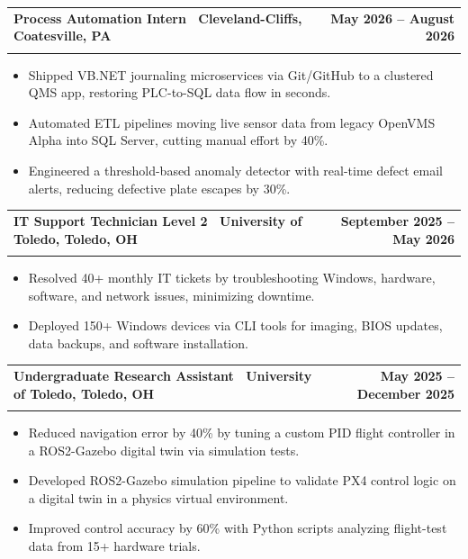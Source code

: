 \documentclass[letterpaper,11pt]{article}
\makeatletter
\newcommand{\resumeItem}[1]{\item\small{#1 \vspace{-4pt}}}
\newcommand{\resumeSubheading}[4]{
    \vspace{-2pt}\item
    \begin{tabular*}{1.0\textwidth}[t]{l@{\extracolsep{\fill}}r}
        \textbf{#1} & \textbf{\small #2} \\
        \textit{\small#3} & \textit{\small #4}
    \end{tabular*}\vspace{-7pt}
}
\newcommand{\resumeItemListStart}{\begin{itemize}}
\newcommand{\resumeItemListEnd}{\end{itemize}\vspace{-7pt}}
\makeatother
\begin{document}
\resumeSubheading
{\textbf{Process Automation Intern} \textnormal{\textbar\ Cleveland-Cliffs, Coatesville, PA}}{May 2026 -- August 2026}
{}{}
\vspace{-0.6cm}
\resumeItemListStart

\resumeItem{Shipped VB.NET journaling microservices via Git/GitHub to a clustered QMS app, restoring PLC-to-SQL data flow in seconds.}

\vspace{0.15cm}

\resumeItem{Automated ETL pipelines moving live sensor data from legacy OpenVMS Alpha into SQL Server, cutting manual effort by 40\%.}
\vspace{0.15cm}


\resumeItem{Engineered a threshold-based anomaly detector with real-time defect email alerts, reducing defective plate escapes by 30\%.}





\vspace{0.15cm}
\resumeItemListEnd
\resumeSubheading
{\textbf{IT Support Technician Level 2} \textnormal{\textbar\ University of Toledo, Toledo, OH}}{September 2025 -- May 2026}
{}{}
\vspace{-0.6cm}
\resumeItemListStart

\resumeItem{Resolved 40+ monthly IT tickets by troubleshooting Windows, hardware, software, and network issues, minimizing downtime.}

\vspace{0.15cm}
\resumeItem{Deployed 150+ Windows devices via CLI tools for imaging, BIOS updates, data backups, and software installation.}

\vspace{0.15cm}

\resumeItemListEnd

\resumeSubheading
{\textbf{Undergraduate Research Assistant} \textnormal{\textbar\ University of Toledo, Toledo, OH}}{May 2025 -- December 2025}
{}{}
\vspace{-0.6cm}
\resumeItemListStart
\resumeItem{Reduced navigation error by 40\% by tuning a custom PID flight controller in a ROS2-Gazebo digital twin via simulation tests.}
\vspace{0.15cm} 
\resumeItem{Developed ROS2-Gazebo simulation pipeline to validate PX4 control logic on a digital twin in a physics virtual environment.}
\vspace{0.15cm}
\resumeItem{Improved control accuracy by 60\% with Python scripts analyzing flight-test data from 15+ hardware trials.}
\resumeItemListEnd
\end{document}
